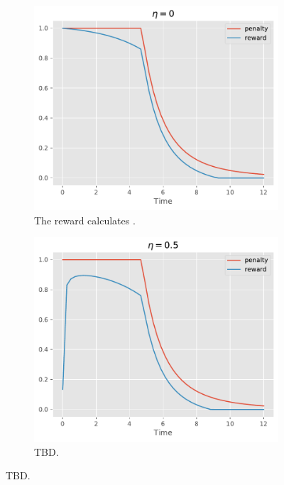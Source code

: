 \documentclass[english, 12pt, a4paper, elec, utf8, a-1b, online]{aaltothesis}
\begin{document}
\begin{figure}[h]
    \centering
    \begin{subfigure}[b]{0.45\textwidth}
        \centering
        \includegraphics[width=\textwidth]{figures/rl_formulation/reward_0.pdf}
        \caption{ The reward calculates  .}
    \end{subfigure}
    \begin{subfigure}[b]{0.45\textwidth}
        \centering
        \includegraphics[width=\textwidth]{figures/rl_formulation/reward_5.0.pdf}
        \caption{ TBD.}

\end{subfigure}
\end{figure}
\end{document}
